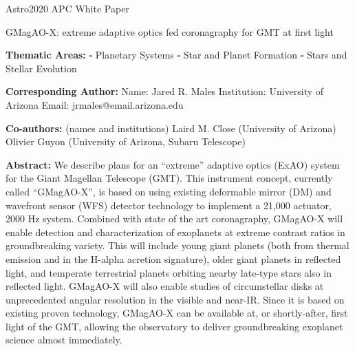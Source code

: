 \documentclass[12pt,preprint]{aastex}
\begin{document}
\thispagestyle{empty}

\raggedright
\huge
Astro2020 APC White Paper \linebreak

GMagAO-X: extreme adaptive optics fed coronagraphy for GMT at first light \linebreak
\normalsize

\noindent \textbf{Thematic Areas:} \linebreak
\hspace*{60pt} $\square$ Planetary Systems \linebreak
\hspace*{60pt} $\square$ Star and Planet Formation \linebreak
\hspace*{60pt}  $\square$  Stars and Stellar Evolution \linebreak
  
\textbf{Corresponding Author:}
Name: Jared R. Males \linebreak
Institution:  University of Arizona \linebreak
Email: jrmales@email.arizona.edu \linebreak
 
\textbf{Co-authors:} (names and institutions)
  \linebreak
Laird M. Close (University of Arizona) \\
Olivier Guyon (University of Arizona, Subaru Telescope)

\textbf{Abstract:} We describe plans for an ``extreme'' adaptive optics (ExAO) system for the Giant Magellan Telescope (GMT).  This instrument concept, currently called ``GMagAO-X'', is based on using existing deformable mirror (DM) and wavefront sensor (WFS) detector technology to implement a 21,000 actuator, 2000 Hz system.  Combined with state of the art coronagraphy, GMagAO-X will enable detection and characterization of exoplanets at extreme contrast ratios in groundbreaking variety.  This will include young giant planets (both from thermal emission and in the H-alpha acretion signature), older giant planets in reflected light, and temperate terrestrial planets orbiting nearby late-type stars also in reflected light.  GMagAO-X will also enable studies of circumstellar disks at unprecedented angular resolution in the visible and near-IR.  Since it is based on existing proven technology, GMagAO-X can be available at, or shortly-after, first light of the GMT, allowing the observatory to deliver groundbreaking exoplanet science almost immediately.  
\clearpage
\setcounter{page}{1}
\end{document}
